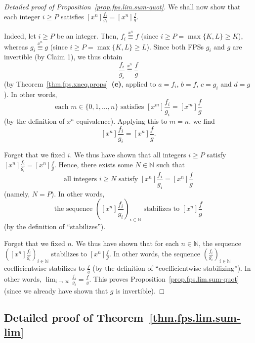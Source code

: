 \begin{proof}[Detailed proof of Proposition~\ref{prop.fps.lim.sum-quot}]
We shall now show that each integer $i\geq P$ satisfies
$[x^n] \frac{f_i}{g_i} = [x^n] \frac{f}{g}$.

Indeed, let $i\geq P$ be an integer. Then,
$f_i \overset{x^n}{\equiv} f$
(since $i\geq P = \max\{K, L\} \geq K$), whereas
$g_i \overset{x^n}{\equiv} g$
(since $i\geq P = \max\{K, L\} \geq L$). Since both FPSs $g_i$ and
$g$ are invertible (by Claim 1), we thus obtain
\[
\frac{f_i}{g_i} \overset{x^n}{\equiv} \frac{f}{g}
\]
(by Theorem~\ref{thm.fps.xneq.props}~\textbf{(e)}, applied to
$a = f_i$, $b = f$, $c = g_i$ and $d = g$). In other words,
\[
\text{each } m\in\{0,1,\ldots,n\} \text{ satisfies }
[x^m] \frac{f_i}{g_i} = [x^m] \frac{f}{g}
\]
(by the definition of $x^n$-equivalence). Applying this to $m = n$,
we find
\[
[x^n] \frac{f_i}{g_i} = [x^n] \frac{f}{g}.
\]

Forget that we fixed $i$. We thus have shown that all integers $i\geq P$
satisfy $[x^n] \frac{f_i}{g_i} = [x^n] \frac{f}{g}$. Hence, there
exists some $N\in\mathbb{N}$ such that
\[
\text{all integers } i\geq N \text{ satisfy }
[x^n] \frac{f_i}{g_i} = [x^n] \frac{f}{g}
\]
(namely, $N = P$). In other words,
\[
\text{the sequence } \left([x^n] \frac{f_i}{g_i}\right)_{i\in\mathbb{N}}
\text{ stabilizes to } [x^n] \frac{f}{g}
\]
(by the definition of ``stabilizes'').

Forget that we fixed $n$. We thus have shown that for each
$n\in\mathbb{N}$, the sequence
$\left([x^n] \frac{f_i}{g_i}\right)_{i\in\mathbb{N}}$ stabilizes to
$[x^n] \frac{f}{g}$. In other words, the sequence
$\left(\frac{f_i}{g_i}\right)_{i\in\mathbb{N}}$ coefficientwise
stabilizes to $\frac{f}{g}$ (by the definition of ``coefficientwise
stabilizing''). In other words,
$\lim_{i\to\infty} \frac{f_i}{g_i} = \frac{f}{g}$.
This proves Proposition~\ref{prop.fps.lim.sum-quot} (since we already
have shown that $g$ is invertible).
\end{proof}

\subsection{Detailed proof of Theorem~\ref{thm.fps.lim.sum-lim}}

